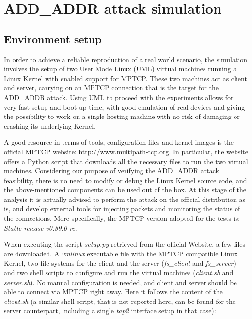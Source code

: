 \chapter{ADD\_ADDR attack simulation}
\label{chap:addaddrattackexecution}

\section{Environment setup}
\label{envsetup}
In order to achieve a reliable reproduction of a real world scenario, the simulation involves the setup of two User Mode Linux (UML) virtual machines running a Linux Kernel with enabled support for MPTCP. These two machines act as client and server, carrying on an MPTCP connection that is the target for the ADD\_ADDR attack.
Using UML to proceed with the experiments allows for very fast setup and boot-up time, with good emulation of real devices and giving the possibility to work on a single hosting machine with no risk of damaging or crashing its underlying Kernel.

A good resource in terms of tools, configuration files and kernel images is the official MPTCP website:
\url{http://www.multipath-tcp.org}. In particular, the website offers a Python script that downloads all the necessary files to run the two virtual machines. Considering our purpose of verifying the ADD\_ADDR attack feasibility, there is no need to modify or debug the Linux Kernel source code, and the above-mentioned components can be used out of the box. At this stage of the analysis it is actually advised to perform the attack on the official distribution as is, and develop external tools for injecting packets and monitoring the status of the connections. More specifically, the MPTCP version adopted for the tests is: \textit{Stable release v0.89.0-rc}.

When executing the script \textit{setup.py} retrieved from the official Website, a few files are downloaded. A \textit{vmlinux} executable file with the MPTCP compatible Linux Kernel, two file-systems for the client and the server (\textit{fs\_client} and \textit{fs\_server}) and two shell scripts to configure and run the virtual machines (\textit{client.sh} and \textit{server.sh}). No manual configuration is needed, and client and server should be able to connect via MPTCP right away.
Here it follows the content of the \textit{client.sh} (a similar shell script, that is not reported here, can be found for the server counterpart, including a single \textit{tap2} interface setup in that case):


